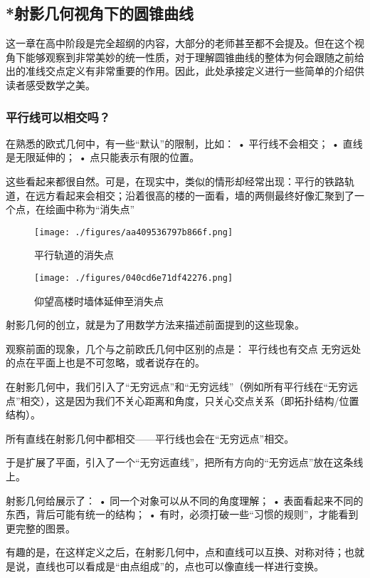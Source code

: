 \subsection{*射影几何视角下的圆锥曲线}\label{sub_HsCsFD_1}

这一章在高中阶段是完全超纲的内容，大部分的老师甚至都不会提及。但在这个视角下能够观察到非常美妙的统一性质，对于理解圆锥曲线的整体为何会跟随之前给出的准线交点定义有非常重要的作用。因此，此处承接定义进行一些简单的介绍供读者感受数学之美。

\subsubsection{平行线可以相交吗？}

在熟悉的欧式几何中，有一些“默认”的限制，比如：
	•	平行线不会相交；
	•	直线是无限延伸的；
	•	点只能表示有限的位置。

这些看起来都很自然。可是，在现实中，类似的情形却经常出现：平行的铁路轨道，在远方看起来会相交；沿着很高的楼的一面看，墙的两侧最终好像汇聚到了一个点，在绘画中称为“消失点”

\begin{figure}[ht]
\centering
\texttt{[image: ./figures/aa409536797b866f.png]}
\caption{平行轨道的消失点} \label{fig_HsCsFD_2}
\end{figure}

\begin{figure}[ht]
\centering
\texttt{[image: ./figures/040cd6e71df42276.png]}
\caption{仰望高楼时墙体延伸至消失点} \label{fig_HsCsFD_3}
\end{figure}
射影几何的创立，就是为了用数学方法来描述前面提到的这些现象。

观察前面的现象，几个与之前欧氏几何中区别的点是：
平行线也有交点
无穷远处的点在平面上也是不可忽略，或者说存在的。

在射影几何中，我们引入了“无穷远点”和“无穷远线”（例如所有平行线在“无穷远点”相交），这是因为我们不关心距离和角度，只关心交点关系（即拓扑结构/位置结构）。

所有直线在射影几何中都相交——平行线也会在“无穷远点”相交。

于是扩展了平面，引入了一个“无穷远直线”，把所有方向的“无穷远点”放在这条线上。

射影几何给展示了：
	•	同一个对象可以从不同的角度理解；
	•	表面看起来不同的东西，背后可能有统一的结构；
	•	有时，必须打破一些“习惯的规则”，才能看到更完整的图景。

有趣的是，在这样定义之后，在射影几何中，点和直线可以互换、对称对待；也就是说，直线也可以看成是“由点组成”的，点也可以像直线一样进行变换。


